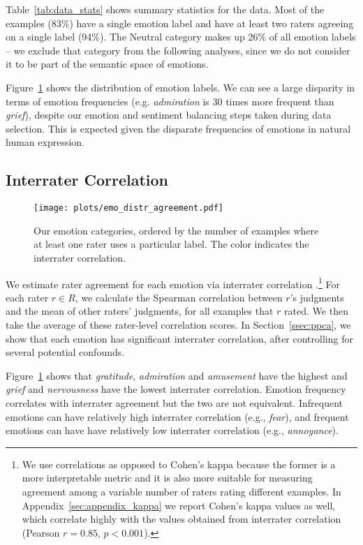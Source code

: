\documentclass[11pt,a4paper]{article}
\begin{document}
Table~\ref{tab:data_stats} shows summary statistics for the data. Most of the examples (83\%) have a single emotion label and have at least two raters agreeing on a single label (94\%). The Neutral category makes up 26\% of all emotion labels -- we exclude that category from the following analyses, since we do not consider it to be part of the semantic space of emotions.

Figure~\ref{fig:emo_distr} shows the distribution of emotion labels. We can see a large disparity in terms of emotion frequencies (e.g. \emph{admiration} is 30 times more frequent than \emph{grief}), despite our emotion and sentiment balancing steps taken during data selection. This is expected given the disparate frequencies of emotions in natural human expression.


\subsection{Interrater Correlation}
\label{ssec:interrater_corr}


\begin{figure}[t!]
 \centering
   \centering
   \texttt{[image: plots/emo\_distr\_agreement.pdf]}
   \caption{Our emotion categories, ordered by the number of examples where at least one rater uses a particular label. The color indicates the interrater correlation.}
   \label{fig:emo_distr}
\end{figure}

We estimate rater agreement for each emotion via interrater correlation \citep{delgado2019cohen}.\footnote{We use correlations as opposed to Cohen's kappa \cite{cohen1960coefficient} because the former is a more interpretable metric and it is also more suitable for measuring agreement among a variable number of raters rating different examples. In Appendix~\ref{sec:appendix_kappa} we report Cohen's kappa values as well, which correlate highly with the values obtained from interrater correlation (Pearson $r=0.85$, $p < 0.001$).} For each rater $r\in R$, we calculate the Spearman correlation between $r$'s judgments and the mean of other raters' judgments, for all examples that $r$ rated. We then take the average of these rater-level correlation scores. In Section~\ref{ssec:ppca}, we show that each emotion has significant interrater correlation, after controlling for several potential confounds.

Figure~\ref{fig:emo_distr} shows that \emph{gratitude}, \emph{admiration} and \emph{amusement} have the highest and \emph{grief} and \emph{nervousness} have the lowest interrater correlation. Emotion frequency correlates with interrater agreement but the two are not equivalent. Infrequent emotions can have relatively high interrater correlation (e.g., \emph{fear}), and frequent emotions can have have relatively low interrater correlation (e.g., \emph{annoyance}).
\end{document}
